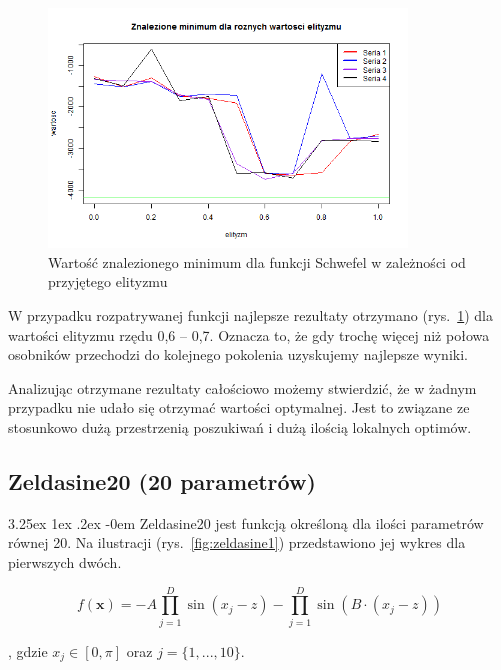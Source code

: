 \documentclass[11pt, a4paper]{article}
\makeatletter
\newcommand{\fbi}{\leavevmode{\parindent=1em\indent}}
\renewcommand\paragraph{\@startsection{paragraph}{5}{\z@}
  {3.25ex \@plus1ex \@minus.2ex}
  {-0em}
  {\normalfont\normalsize\bfseries}}
\makeatother
\begin{document}
\begin{figure}[H]
	\begin{center}
		\includegraphics[width=0.85\textwidth]{./assets/Schwefel6.png}
		\caption{Wartość znalezionego minimum dla funkcji Schwefel w zależności od przyjętego elityzmu}
		\label{fig:schwefel6}
	\end{center}
\end{figure}

\fbi
W przypadku rozpatrywanej funkcji najlepsze rezultaty otrzymano (rys.~\ref{fig:schwefel6}) dla wartości elityzmu rzędu 0,6 -- 0,7. Oznacza to, że gdy trochę więcej niż połowa osobników przechodzi do kolejnego pokolenia uzyskujemy najlepsze wyniki.

\fbi
Analizując otrzymane rezultaty całościowo możemy stwierdzić, że w żadnym przypadku nie udało się otrzymać wartości optymalnej. Jest to związane ze stosunkowo dużą przestrzenią poszukiwań i dużą ilością lokalnych optimów.

\newpage
\subsection{Zeldasine20 (20 parametrów)}
\paragraph{}
Zeldasine20 jest funkcją określoną dla ilości parametrów równej 20. Na ilustracji (rys.~\ref{fig:zeldasine1}) przedstawiono jej wykres dla pierwszych dwóch.

\begin{equation}\label{eq:zeldasine}
f(\boldsymbol{x}) = -A \prod_{j=1}^{D} \sin (x_j - z) - \prod_{j=1}^{D} \sin (B \cdot (x_j - z))
\end{equation}

, gdzie $ x_j \in [0, \pi]$ oraz $j = \{1, ..., 10\}$.
\end{document}
